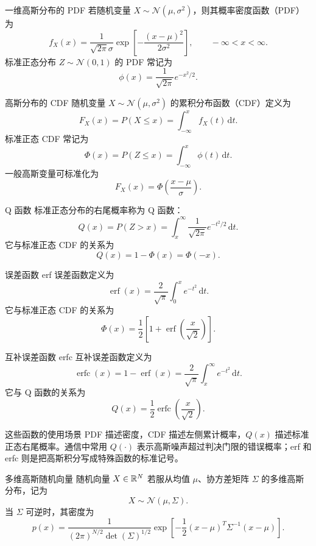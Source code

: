 \begin{definitionBox}{一维高斯分布的 PDF}
若随机变量 $X\sim\mathcal N(\mu,\sigma^2)$，则其概率密度函数（PDF）为
\[
f_X(x)=\frac{1}{\sqrt{2\pi}\sigma}
\exp\left[-\frac{(x-\mu)^2}{2\sigma^2}\right],
\qquad -\infty<x<\infty.
\]
标准正态分布 $Z\sim\mathcal N(0,1)$ 的 PDF 常记为
\[
\phi(x)=\frac{1}{\sqrt{2\pi}}e^{-x^2/2}.
\]
\end{definitionBox}

\begin{definitionBox}{高斯分布的 CDF}
随机变量 $X\sim\mathcal N(\mu,\sigma^2)$ 的累积分布函数（CDF）定义为
\[
F_X(x)=P(X\le x)=\int_{-\infty}^{x} f_X(t)\,\mathrm dt.
\]
标准正态 CDF 常记为
\[
\Phi(x)=P(Z\le x)=\int_{-\infty}^{x}\phi(t)\,\mathrm dt.
\]
一般高斯变量可标准化为
\[
F_X(x)=\Phi\left(\frac{x-\mu}{\sigma}\right).
\]
\end{definitionBox}

\begin{definitionBox}{Q 函数}
标准正态分布的右尾概率称为 Q 函数：
\[
Q(x)=P(Z>x)=\int_x^{\infty}\frac{1}{\sqrt{2\pi}}e^{-t^2/2}\,\mathrm dt.
\]
它与标准正态 CDF 的关系为
\[
Q(x)=1-\Phi(x)=\Phi(-x).
\]
\end{definitionBox}

\begin{definitionBox}{误差函数 erf}
误差函数定义为
\[
\operatorname{erf}(x)=\frac{2}{\sqrt{\pi}}\int_0^x e^{-t^2}\,\mathrm dt.
\]
它与标准正态 CDF 的关系为
\[
\Phi(x)=\frac12\left[1+\operatorname{erf}\left(\frac{x}{\sqrt2}\right)\right].
\]
\end{definitionBox}

\begin{definitionBox}{互补误差函数 erfc}
互补误差函数定义为
\[
\operatorname{erfc}(x)=1-\operatorname{erf}(x)
=\frac{2}{\sqrt{\pi}}\int_x^{\infty}e^{-t^2}\,\mathrm dt.
\]
它与 Q 函数的关系为
\[
Q(x)=\frac12\operatorname{erfc}\left(\frac{x}{\sqrt2}\right).
\]
\end{definitionBox}

\begin{keypoint}{这些函数的使用场景}
PDF 描述密度，CDF 描述左侧累计概率，$Q(x)$ 描述标准正态右尾概率。通信中常用 $Q(\cdot)$ 表示高斯噪声超过判决门限的错误概率；erf 和 erfc 则是把高斯积分写成特殊函数的标准记号。
\end{keypoint}

\begin{definitionBox}{多维高斯随机向量}
随机向量 $X\in\mathbb{R}^N$ 若服从均值 $\mu$、协方差矩阵 $\Sigma$ 的多维高斯分布，记为
\[
X\sim\mathcal N(\mu,\Sigma).
\]
当 $\Sigma$ 可逆时，其密度为
\[
p(x)=\frac{1}{(2\pi)^{N/2}\det(\Sigma)^{1/2}}
\exp\left[-\frac12(x-\mu)^T\Sigma^{-1}(x-\mu)\right].
\]
\end{definitionBox}

